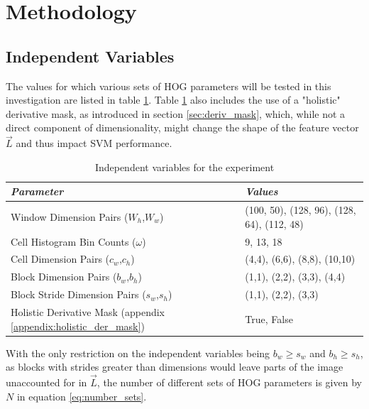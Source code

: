 \section{Methodology}

\subsection{Independent Variables}\label{sec:dependent_variables}


The values for which various sets of HOG parameters will be tested in this investigation are listed in table \ref{table:dependent_variables}. Table \ref{table:dependent_variables} also includes the use of a "holistic" derivative mask, as introduced in section \ref{sec:deriv_mask}, which, while not a direct component of dimensionality, might change the shape of the feature vector $\vec{L}$ and thus impact SVM performance.

\begin{table}
\renewcommand{\arraystretch}{1.0}
\begin{tabular}{@{} l @{\hspace{1cm}} l @{}}    
    \toprule
    \emph{Parameter} & \emph{Values}  \\\midrule
    Window Dimension Pairs ($W_h$,$W_w$)             & (100, 50), (128, 96), (128, 64), (112, 48)  \\ 
    Cell Histogram Bin Counts ($\omega$)              & 9, 13, 18  \\ 
    Cell Dimension Pairs ($c_w$,$c_h$)           & (4,4), (6,6), (8,8), (10,10)  \\ 
    Block Dimension Pairs ($b_w$,$b_h$)           & (1,1), (2,2), (3,3), (4,4)  \\ 
    Block Stride Dimension Pairs ($s_w$,$s_h$)              & (1,1), (2,2), (3,3)  \\ 
    Holistic Derivative Mask (appendix \ref{appendix:holistic_der_mask}) & True, False  \\\bottomrule
\end{tabular}
\caption{Independent variables for the experiment}
\label{table:dependent_variables}
\end{table}

With the only restriction on the independent variables being $b_w\ge s_w$ and $b_h\ge s_h$, as blocks with strides greater than dimensions would leave parts of the image unaccounted for in $\vec{L}$, the number of different sets of HOG parameters is given by $N$ in equation \ref{eq:number_sets}.

